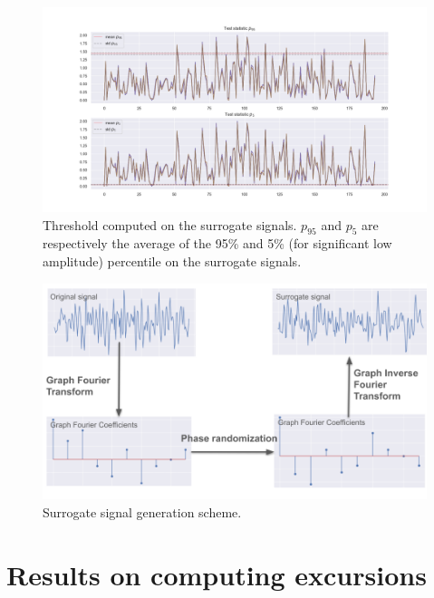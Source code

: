 \begin{figure}
    \centering
    \includegraphics{img/plot_ex_surrogate.png}
    \caption{Threshold computed on the surrogate signals. $p_{95}$ and $p_{5}$ are respectively the average of the 95\% and 5\% (for significant low amplitude) percentile on the surrogate signals.}
    \label{fig:statistic_surr}
\end{figure}

\begin{figure}
    \centering
    \includegraphics{img/surrogate_scheme.png}
    \caption{Surrogate signal generation scheme.}
    \label{surr_scheme}
\end{figure}

\section{Results on computing excursions}

